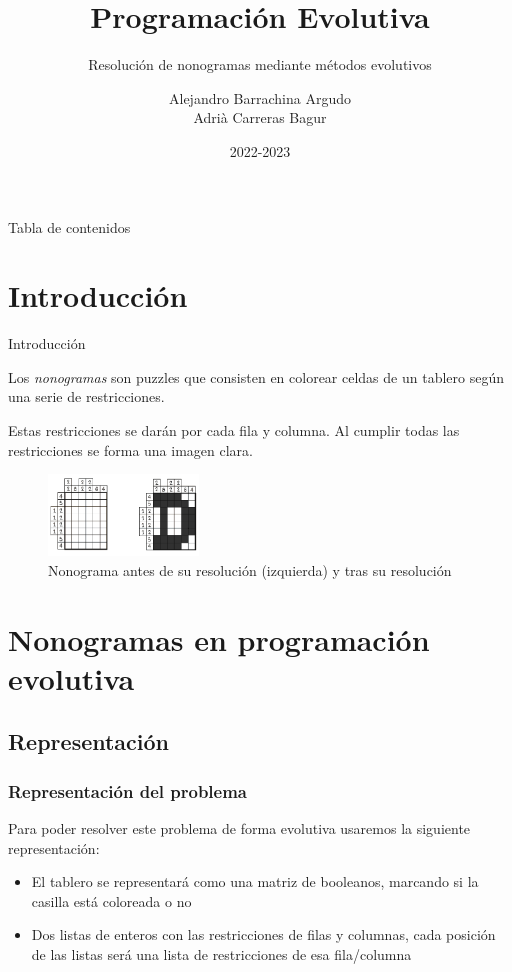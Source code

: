 \documentclass{beamer}
\title{Programación Evolutiva}
\subtitle{Resolución de nonogramas mediante métodos evolutivos}
\date{2022-2023}
\author{Alejandro Barrachina Argudo \\ Adrià Carreras Bagur}
\institute{Universidad Complutense de Madrid}
\begin{document}
\maketitle

\begin{frame}{Tabla de contenidos}
    \tableofcontents
\end{frame}

\section{Introducción}
\begin{frame}{Introducción}

    Los \textit{nonogramas} son puzzles que consisten en colorear celdas de un tablero según una serie de restricciones.

    Estas restricciones se darán por cada fila y columna. Al cumplir todas las restricciones se forma una imagen clara.
    \begin{figure}
        \centering
        \includegraphics[width=4cm]{Images/nonograma.png}
        \caption{ Nonograma antes de su resolución (izquierda) y tras su resolución}
    \end{figure}

\end{frame}
\section{Nonogramas en programación evolutiva}
\subsection{Representación}
\begin{frame}
    \frametitle{Representación del problema}

    Para poder resolver este problema de forma evolutiva usaremos la siguiente representación:
    \begin{itemize}
        \item <1-> El tablero se representará como una matriz de booleanos, marcando si la casilla está coloreada o no
        \item <2-> Dos listas de enteros con las restricciones de filas y columnas, cada posición de las listas será una lista de restricciones de esa fila/columna
    \end{itemize}

\end{frame}
\end{document}
